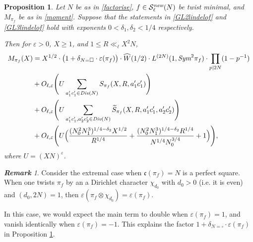 \documentclass[12pt,reqno]{amsart}
\theoremstyle{plain}
\newtheorem{prop}{Proposition}
\theoremstyle{remark}
\newtheorem{remark}{\bf Remark}
\numberwithin{equation}{section}
\numberwithin{lemma}{section}
\numberwithin{theorem}{section}
\numberwithin{prop}{section}
\numberwithin{remark}{section}
\begin{document}
\begin{prop} \label{poissonprop}
Let $N$ be as in \eqref{factorise}, $f \in \mathcal{S}^{\emph{new}}_{\ell}(N)$ be twist minimal,
and $M_{\pi_f}$ 
be as in \eqref{moment}. 
Suppose that the statements in \eqref{GL2lindelof} and \eqref{GL3lindelof} hold with exponents 
$0<\delta_1,\delta_2<1/4$ respectively.

Then for $\varepsilon>0$, $X \geq 1$,  and $1 \leq R \ll_{\ell} X^2 N$,
\begin{align} \label{Mpif}
M_{\pi_f}(X)&=X^{1/2} \cdot \big(1+\delta_{N=\square} \cdot 
\varepsilon(\pi_f) \big) \cdot \widehat{W}(1/2) \cdot L^{(2N)}(1,\emph{Sym}^2 \pi_f)  
\cdot \prod_{p \mid 2N} (1-p^{-1})  \nonumber \\
&+ O_{\ell,\varepsilon} \Bigg( U \sum_{a^{\prime}_1 c^{\prime}_1 \in \emph{Div}(N)  } 
S_{\pi_f}(X,R,a_1^{\prime} c_1^{\prime} ) \Bigg) \nonumber \\
&+O_{\ell,\varepsilon} \Bigg( U \sum_{a_1^{\prime} c_1^{\prime}, a_2^{\prime} c_2^{\prime} \in \emph{Div}(N)}
   \widetilde{S}_{\pi_f}(X,R,a_1^{\prime} c_1^{\prime},a_2^{\prime} c_2^{\prime} ) \Bigg)  \nonumber \\
&+O_{\ell,\varepsilon} \Bigg( U \Big( 
\frac{(N_0^2 N_1^3)^{1/4-\delta_2} X^{1/2}}{R^{1/4}} 
+\frac{(N_0^2 N_1^3)^{1/4-\delta_2} R^{1/4}}{N^{1/4} N_0^{3/4}} +1 \Big) \Bigg),
\end{align}
where $U=(XN)^{\varepsilon}$.
\end{prop}

\begin{remark}
Consider the extremal case when $\mathfrak{c}(\pi_f)=N$ is a perfect square. 
When one twists $\pi_f$ by an a Dirichlet character $\chi_{d_0}$ 
with $d_0>0$ (i.e. it is even) and $(d_0,2N)=1$, 
then $\varepsilon(\pi_f \otimes \chi_{d_0})=\varepsilon(\pi_f)$.  

In this case, we would expect the main term to double
when $\varepsilon(\pi_f)=1$, and vanish identically when $\varepsilon(\pi_f)=-1$.
This explains the factor $1+\delta_{N=\square} \cdot \varepsilon(\pi_f)$ in 
Proposition \ref{poissonprop}. 
 \end{remark}
\end{document}
